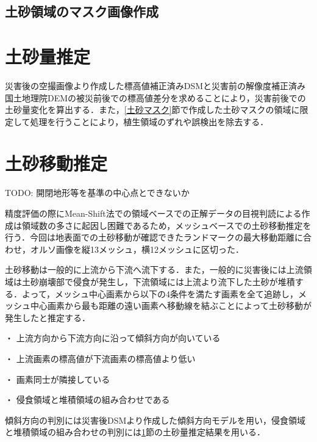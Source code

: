     \subsection{土砂領域のマスク画像作成}
    

  \section{土砂量推定}
    \label{土砂量推定}
    災害後の空撮画像より作成した標高値補正済みDSMと災害前の解像度補正済み国土地理院DEMの被災前後での標高値差分を求めることにより，災害前後での土砂量変化を算出する．また，\ref{土砂マスク}節で作成した土砂マスクの領域に限定して処理を行うことにより，植生領域のずれや誤検出を除去する．


  \section{土砂移動推定}
    \label{土砂移動推定}
      TODO: 開閉地形等を基準の中心点とできないか

    精度評価の際にMean-Shift法での領域ベースでの正解データの目視判読による作成は領域数の多さに起因し困難であるため，メッシュベースでの土砂移動推定を行う．今回は地表面での土砂移動が確認できたランドマークの最大移動距離に合わせ，オルソ画像を縦13メッシュ，横12メッシュに区切った．

    土砂移動は一般的に上流から下流へ流下する．また，一般的に災害後には上流領域は土砂崩壊部で侵食が発生し，下流領域には上流より流下した土砂が堆積する．よって，メッシュ中心画素から以下の4条件を満たす画素を全て追跡し，メッシュ中心画素から最も距離の遠い画素へ移動線を結ぶことによって土砂移動が発生したと推定する．

    ・	上流方向から下流方向に沿って傾斜方向が向いている

    ・	上流画素の標高値が下流画素の標高値より低い
    
    ・	画素同士が隣接している
    
    ・	侵食領域と堆積領域の組み合わせである

    傾斜方向の判別には災害後DSMより作成した傾斜方向モデルを用い，侵食領域と堆積領域の組み合わせの判別には\ref{土砂量推定}節の土砂量推定結果を用いる．
  

